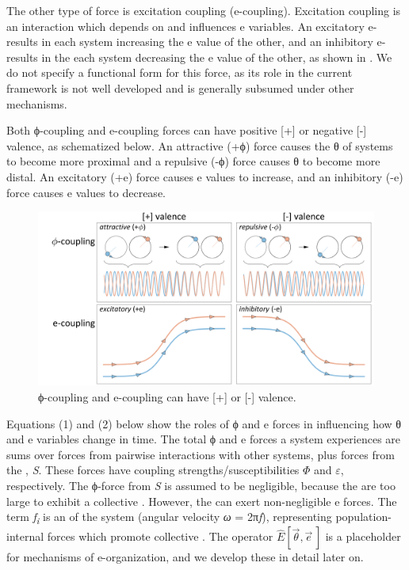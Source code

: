   The other type of force is excitation coupling (e-coupling). Excitation coupling is an interaction which depends on and influences e variables. An excitatory e- results in each system increasing the e value of the other, and an inhibitory e- results in the each system decreasing the e value of the other, as shown in {}. We do not specify a functional form for this force, as its role in the current framework is not well developed and is generally subsumed under other mechanisms.

  Both ϕ-coupling and e-coupling forces can have positive [+] or negative [-] valence, as schematized below. An attractive (+ϕ) force causes the θ of systems to become more proximal and a repulsive (-ϕ) force causes θ to become more distal. An excitatory (+e) force causes e values to increase, and an inhibitory (-e) force causes e values to decrease. 

  
\begin{figure}
\includegraphics[width=\textwidth]{figures/Tilsen-img20.png}
\caption{ϕ-coupling and e-coupling can have [+] or [-] valence.}
\label{fig:2:13}
\end{figure}
 

  Equations (1) and (2) below show the roles of ϕ and e forces in influencing how θ and e variables change in time. The total ϕ and e forces a system experiences are sums over forces from pairwise interactions with other systems, plus forces from the , \textit{S}. These forces have coupling strengths/susceptibilities $\Phi$ and $\varepsilon $, respectively. The ϕ-force from \textit{S} is assumed to be negligible, because the  are too large to exhibit a collective . However, the  can exert non-negligible e forces. The term \textit{f\textsubscript{i}} is an  of the system (angular velocity \textit{ω} = 2π\textit{f}), representing population-internal forces which promote collective . The operator  $\widehat{E}[\overrightarrow{\theta} ,\overrightarrow{e}\,]$ is a placeholder for mechanisms of e-organization, and we develop these in detail later on.

